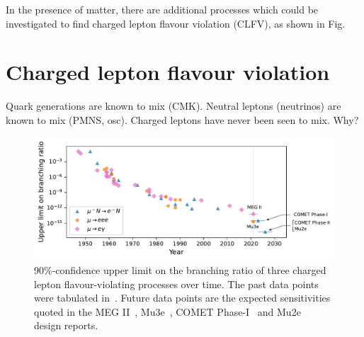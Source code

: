 In the presence of matter, there are additional processes which could be
investigated to find charged lepton flavour violation (CLFV), as shown in Fig.



\cite{PhysRevLett.126.141801} %

\cite{lhcbcollaboration2021test} %




\section{Charged lepton flavour violation}
Quark generations are known to mix (CMK).
Neutral leptons (neutrinos) are known to mix (PMNS, osc).
Charged leptons have never been seen to mix. Why?

\begin{figure}
    \centering
    \includegraphics{chapter1/clfv_upper_limit_v2.pdf}
    \caption{90\%-confidence upper limit on the branching ratio of three charged lepton flavour-violating processes over time. The past data points were tabulated in~\cite{BERNSTEIN201327}. Future data points are the expected sensitivities quoted in the MEG II~\cite{Baldini2018}, Mu3e~\cite{ARNDT2021165679}, COMET Phase-I~\cite{the_comet_collaboration_comet_2020} and Mu2e~\cite{bartoszek2015mu2e} design reports.}
    \label{fig:clfv_upper_limit}
\end{figure}




